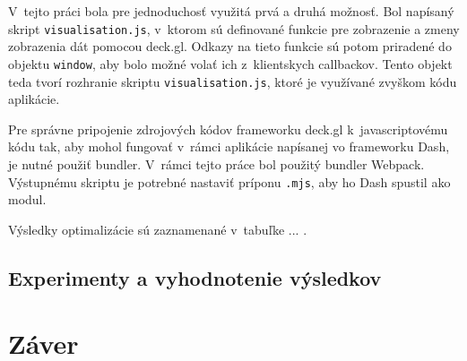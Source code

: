V~tejto práci bola pre jednoduchosť využitá prvá a druhá možnosť. Bol napísaný skript \texttt{visualisation.js}, v~ktorom sú definované funkcie pre zobrazenie a zmeny zobrazenia dát pomocou deck.gl. Odkazy na tieto funkcie sú potom priradené do objektu \texttt{window}, aby bolo možné volať ich z~klientskych callbackov. Tento objekt teda tvorí rozhranie skriptu \texttt{visualisation.js}, ktoré je využívané zvyškom kódu aplikácie.

Pre správne pripojenie zdrojových kódov frameworku deck.gl k~javascriptovému kódu tak, aby mohol fungovať v~rámci aplikácie napísanej vo frameworku Dash, je nutné použiť bundler. V~rámci tejto práce bol použitý bundler Webpack. Výstupnému skriptu je potrebné nastaviť príponu \texttt{.mjs}, aby ho Dash spustil ako modul.

Výsledky optimalizácie sú zaznamenané v~tabuľke ... .

\section{Experimenty a vyhodnotenie výsledkov}

\chapter{Záver}



%

